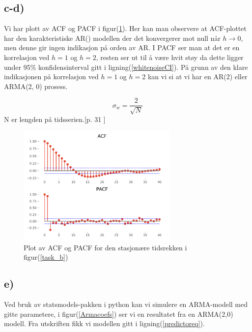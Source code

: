 \subsection{c-d)}

Vi har plott av ACF og PACF i figur(\ref{task_c}). Her kan man observere at ACF-plottet har den karakteristiske AR() modellen der det konvergerer mot null når $h \rightarrow 0$, men denne gir ingen indikasjon på orden av AR. I PACF ser man at det er en korrelasjon ved $h = 1$ og $h = 2$, resten ser ut til å være hvit støy da dette ligger under 95\% konfidensinterval gitt i ligning(\ref{whitenoiseCI}). På grunn av den klare indikasjonen på korrelasjon ved $h = 1$ og $h = 2$ kan vi si at vi har en AR(2) eller ARMA(2, 0) prosess. 

\begin{equation}
    \sigma_{w} = \frac{2}{\sqrt{N}}
\label{whitenoiseCI}
\end{equation}
N er lengden på tidsserien.[p. 31 \cite{Timeseries}]


\begin{figure}[hbt!]
    {\centering
        \includegraphics[width=0.70\textwidth]{task_c.pdf}
        \caption{Plot av ACF og PACF for den stasjonære tidsrekken i figur(\ref{task_b})}
        \label{task_c}
    \par}
    \end{figure}




\subsection{e)}
Ved bruk av statsmodels-pakken i python kan vi simulere en ARMA-modell med gitte parametere, i figur(\ref{Armacoefs}) ser vi en resultatet fra en ARMA(2,0) modell. Fra utskriften fikk vi modellen gitt i ligning(\ref{predictoreq}).

